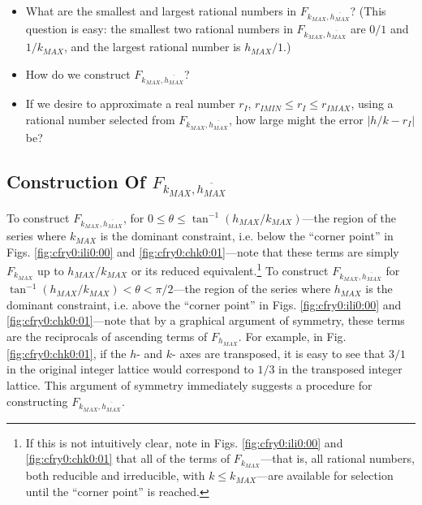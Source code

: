 \begin{itemize}
\item What are the smallest and largest rational numbers in
      $F_{k_{MAX}, \overline{h_{MAX}}}$?
      (This question is easy:  the smallest two rational numbers
	  in $F_{k_{MAX}, \overline{h_{MAX}}}$ are $0/1$
	  and $1/k_{MAX}$, and the largest rational number
	  is $h_{MAX}/1$.)

\item How do we construct $F_{k_{MAX}, \overline{h_{MAX}}}$?

\item If we desire to approximate a real number 
      $r_I$, $r_{IMIN} \leq r_I \leq r_{IMAX}$,
      using a rational number selected from 
	  $F_{k_{MAX}, \overline{h_{MAX}}}$, how large might
      the error $| h/k - r_I |$ be?
\end{itemize}


\subsection[Construction Of $F_{k_{MAX},\overline{h_{MAX}}}$]
           {Construction Of \mbox{\boldmath $F_{k_{MAX},\overline{h_{MAX}}}$}}

To construct $F_{k_{MAX}, \overline{h_{MAX}}}$, for 
$0 \leq \theta \leq \tan^{-1} (h_{MAX}/k_{MAX})$---the 
region of the series where $k_{MAX}$ is the dominant constraint,
i.e. below the ``corner point'' in Figs. \ref{fig:cfry0:ili0:00}
and \ref{fig:cfry0:chk0:01}---note
that these terms are simply 
$F_{k_{MAX}}$ up to $h_{MAX}/k_{MAX}$ or its reduced 
equivalent.\footnote{If this is not intuitively clear,
note in Figs. \ref{fig:cfry0:ili0:00} and \ref{fig:cfry0:chk0:01}
that all of the terms of $F_{k_{MAX}}$---that is, all rational
numbers, both reducible and irreducible, with $k \leq k_{MAX}$---are 
available for selection
until the ``corner point'' is reached.}
To construct $F_{k_{MAX}, \overline{h_{MAX}}}$ for
$\tan^{-1} (h_{MAX}/k_{MAX}) < \theta < \pi/2$---the 
region of the series where $h_{MAX}$ is the dominant constraint,
i.e. above the ``corner point'' in Figs. \ref{fig:cfry0:ili0:00}
and \ref{fig:cfry0:chk0:01}---note that by a graphical argument
of symmetry, these terms are the reciprocals of ascending terms of $F_{h_{MAX}}$.
For example, in Fig. \ref{fig:cfry0:chk0:01}, if the $h$- and $k$-
axes are transposed, it is easy to see that $3/1$ in the original integer lattice
would correspond to $1/3$ in the transposed integer lattice.  This argument of
symmetry immediately suggests a procedure for constructing 
$F_{k_{MAX},\overline{h_{MAX}}}$.

